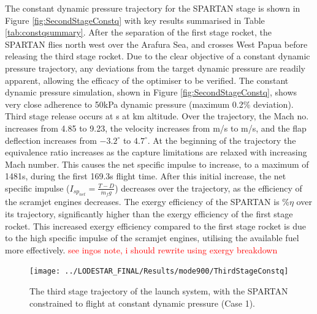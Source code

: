 The constant dynamic pressure trajectory for the SPARTAN stage is shown in Figure \ref{fig:SecondStageConstq} with key results summarised in Table \ref{tab:constqsummary}. After the separation of the first stage rocket, the SPARTAN flies north west over the Arafura Sea, and crosses West Papua before releasing the third stage rocket. Due to the clear objective of a constant dynamic pressure trajectory, any deviations from the target dynamic pressure are readily apparent, allowing the efficacy of the optimiser to be verified. 
The constant dynamic pressure simulation, shown in Figure \ref{fig:SecondStageConstq}, shows very close adherence to 50kPa dynamic pressure (maximum 0.2\% deviation). Third stage release occurs at \secondFlightTimeConstqNoReturn s at \secondthirdSeparationAltConstqNoReturn km altitude. 
Over the trajectory, the Mach no. increases from 4.85 to 9.23, the velocity increases from \firstsecondSeparationvConstqNoReturn m/s to \secondthirdSeparationvConstqNoReturn m/s, and the flap deflection increases from $-3.2^\circ$ to $4.7^\circ$. At the beginning of the trajectory the equivalence ratio increases as the capture limitations are relaxed with increasing Mach number. This causes the net specific impulse to increase, to a maximum of 1481s, during the first 169.3s flight time.  After this initial increase, the net specific impulse ($I_{sp_{net}} = \frac{T-D}{\dot{m}_f g}$) decreases over the trajectory, as the efficiency of the scramjet engines decreases. 
The exergy efficiency of the SPARTAN is \secondExergyEffConstqNoReturn\%$\eta$ over its trajectory, significantly higher than the exergy efficiency of the first stage rocket. This increased exergy efficiency compared to the first stage rocket is due to the high specific impulse of the scramjet engines, utilising the available fuel more effectively. 
\textcolor{red}{see ingos note, i should rewrite using exergy breakdown}


\begin{figure}[ht!]
\centering
\texttt{[image: ../LODESTAR\_FINAL/Results/mode900/ThirdStageConstq]}
\caption{The third stage trajectory of the launch system, with the SPARTAN constrained to flight at constant dynamic pressure (Case 1).}
\label{fig:ThirdStageConstq}
\end{figure}

